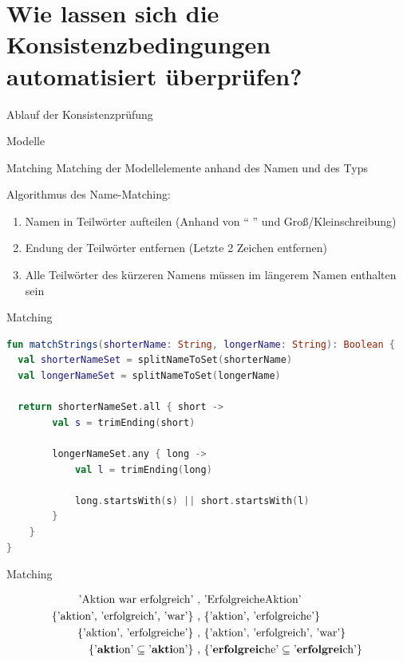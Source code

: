 \section{Wie lassen sich die Konsistenzbedingungen automatisiert überprüfen?}

\begin{frame}{Ablauf der Konsistenzprüfung}
  
\end{frame}

\begin{frame}{Modelle}
  
\end{frame}

\begin{frame}{Matching}
  Matching der Modellelemente anhand des Namen und des Typs

  Algorithmus des Name-Matching:
  \begin{enumerate}
    \item Namen in Teilwörter aufteilen (Anhand von `` '' und Groß/Kleinschreibung)
    \item Endung der Teilwörter entfernen (Letzte 2 Zeichen entfernen)
    \item Alle Teilwörter des kürzeren Namens müssen im längerem Namen enthalten sein
  \end{enumerate}
\end{frame}
\begin{frame}[fragile]{Matching}
\begin{lstlisting}[language=Kotlin]
fun matchStrings(shorterName: String, longerName: String): Boolean {
  val shorterNameSet = splitNameToSet(shorterName)
  val longerNameSet = splitNameToSet(longerName)

  return shorterNameSet.all { short ->
        val s = trimEnding(short)

        longerNameSet.any { long ->
            val l = trimEnding(long)

            long.startsWith(s) || short.startsWith(l)
        }
    }
}
\end{lstlisting}
\end{frame}
\begin{frame}{Matching}
  \begin{figure}
    \centering
    \begin{align}
        \text{'Aktion war erfolgreich'}\ ,&\ \text{'ErfolgreicheAktion'} \nonumber\\
        \text{\{'aktion', 'erfolgreich', 'war'\}}\ ,&\ \text{\{'aktion', 'erfolgreiche'\}} \nonumber\\
        \text{\{'aktion', 'erfolgreiche'\}}\ ,&\ \text{\{'aktion', 'erfolgreich', 'war'\}} \nonumber\\
        \text{\{'\textbf{akti}on'} \subseteq \text{'\textbf{akti}on'\}}\ ,&\ \text{\{'\textbf{erfolgreic}he'} \subseteq \text{'\textbf{erfolgrei}ch'\}} \nonumber
    \end{align}
    \label{eq:name_matching}
  \end{figure}
\end{frame}
